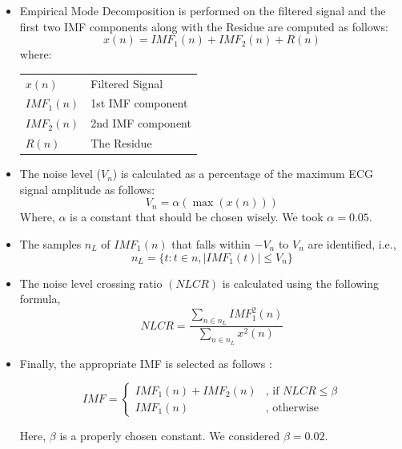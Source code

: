 \documentclass[12pt,a4paper]{article}
\makeatletter
\newenvironment{conditions}
{\par\vspace{\abovedisplayskip}\noindent\begin{tabular}{>{$}l<{$} @{${}={}$} l}}
	{\end{tabular}\par\vspace{\belowdisplayskip}}
\makeatother
\begin{document}
\begin{itemize}
    \item Empirical Mode Decomposition is performed on the filtered signal and the first two IMF components along with the Residue are computed as follows:
    \begin{equation}
        x(n) = IMF_1(n) + IMF_2(n) + R(n)
    \end{equation}
    where:
    \begin{conditions}
        x(n)     &  Filtered Signal \\
        IMF_1(n) &   1st IMF component \\
        IMF_2(n) &   2nd IMF component \\
        R(n)  &   The Residue
    \end{conditions}
    
    \item The noise level ($V_n$) is calculated as a percentage of the maximum ECG signal amplitude as follows:
    \begin{equation}
        V_n= \alpha (\max(x(n)))
    \end{equation}
    Where, $\alpha$ is a constant that should be chosen wisely. We took $\alpha=0.05$.
    
    \item The samples $n_L$ of $IMF_1(n)$ that falls within $-V_n$ to $V_n$ are identified, i.e.,
    \begin{equation}
        n_L = \{ t : t \in n  , | IMF_1(t) | \leq V_n \}
    \end{equation}
    
    
    \item The noise level crossing ratio $(NLCR)$ is calculated using the following formula,
    \begin{equation}
        NLCR = \frac{\sum_{n\in n_L}IMF_1^2(n)}{\sum_{n\in n_L}x^2(n)}
    \end{equation}
    
    
    \item Finally, the appropriate IMF is selected as follows :
    
    \begin{equation}
        IMF=
    \left\{ \begin{array}{ll}
    IMF_1(n)+IMF_2(n) & \text{, if } NLCR \leq \beta \\
    IMF_1(n) &\text{, otherwise}
    \end{array} \right.
    \end{equation}
    
    Here, $\beta$ is a properly chosen constant. We considered $\beta=0.02$.
\end{itemize}
\end{document}
